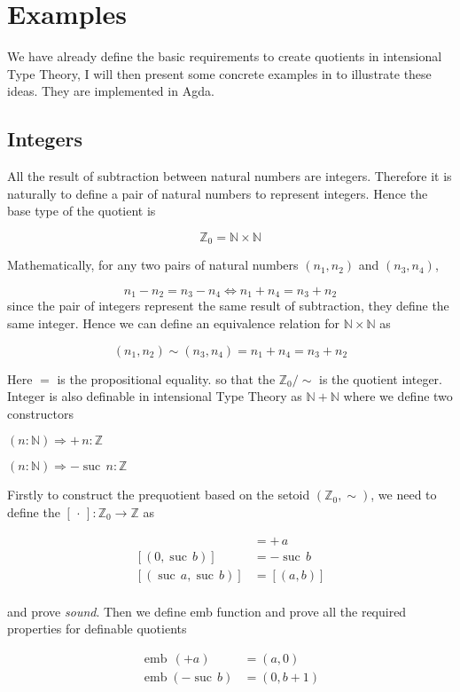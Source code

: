 \documentclass[envcountsame]{llncs}
\newcommand{\N}{\mathbb{N}}
\newcommand{\Z}{\mathbb{Z}}
\newcommand{\dotph}{\,\cdot\,}
\providecommand{\class}[1]{[#1]}
\DeclareMathOperator{\emb}{emb}
\DeclareMathOperator{\suc}{suc\,}
\renewcommand{\equiv}{=}
\begin{document}
\section{Examples}
We have already define the basic requirements to create quotients in intensional Type Theory, I will then present some concrete examples in \cite{nuo:10} to illustrate these ideas. They are implemented in Agda. 

\subsection{Integers}


All the result of subtraction between natural numbers are integers. Therefore it is naturally to define a pair of
natural numbers to represent integers. Hence the base type of the quotient is

$$\Z_0=\N \times \N$$

Mathematically, for any two pairs of natural numbers $(n_1, n_2)$ and $(n_3, n_4)$, 

$$ n_1 - n_2 = n_3 - n_4\iff n_1 + n_4 = n_3 + n_2$$
since the pair of integers represent the same result of subtraction, they define the same integer. Hence we can define an equivalence relation for $\N \times \N$ as

\[ (n_1, n_2) \sim (n_3, n_4) = n_1 + n_4 \equiv n_3 + n_2 
 \]


Here $\equiv$ is the propositional equality. so that the $\Z_0/\sim$ is the quotient integer.
Integer is also definable in intensional Type Theory as $\N+\N$ where we define two constructors

$ (n \colon \N) \Rightarrow + \,n \colon\Z$

$ (n \colon \N) \Rightarrow -\suc n \colon\Z$


Firstly to construct the prequotient based on the setoid $(\Z_0,\sim)$, we need to define the $\class\dotph \colon \Z_0 \to \Z$ as

\begin{align*}
\class{(a,0)} &= +\,a\\
\class{(0,\suc b)} &= -\suc b\\
\class{(\suc a,\suc b)} &= \class{(a,b)}\\
\end{align*}

and prove \emph{sound}. Then we define emb function and prove all the required properties for definable quotients


\begin{align*}
\emb \,(+ a) &= (a,0)\\
\emb (-\suc b) &= (0,b+1)\\
\end{align*}
\end{document}

